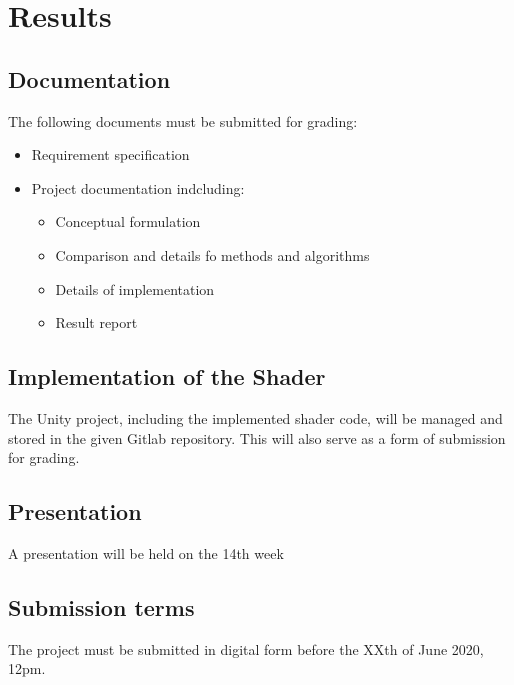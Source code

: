 \section{Results}

\subsection{Documentation}
The following documents must be submitted for grading:
\begin{itemize}
    \item Requirement specification
    \item Project documentation indcluding:
    \begin{itemize}
        \item Conceptual formulation
        \item Comparison and details fo methods and algorithms
        \item Details of implementation
        \item Result report
    \end{itemize}
\end{itemize}

\subsection{Implementation of the Shader}
The Unity project, including the implemented shader code, will be managed and stored in the given Gitlab repository\cite{gitlab}. This will also serve as a form of submission for grading.

\subsection{Presentation}
A presentation will be held on the 14th week 

\subsection{Submission terms}
The project must be submitted in digital form before the XXth of June 2020, 12pm.
